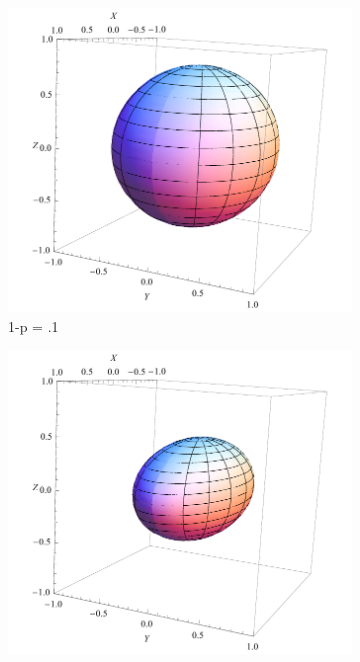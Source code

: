 \documentclass[letterpaper,twoside,10pt]{article}
\begin{document}
\begin{figure}[H]%
\centering
	\begin{subfigure}{.3\textwidth}
		\includegraphics[width=\columnwidth,natwidth=300,natheight=300]{./BitFlip/BitFlipPoint1.pdf}%
		\caption{1-p = .1}%
	\end{subfigure}
	\begin{subfigure}{.3\textwidth}
		\includegraphics[width=\columnwidth,natwidth=300,natheight=300]{./BitFlip/BitFlipPoint25.pdf}%

\end{subfigure}
\end{figure}
\end{document}
